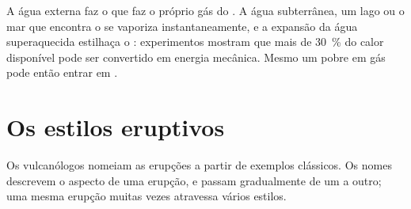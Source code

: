A água externa faz o que faz o próprio gás do . A água subterrânea, um lago ou o
mar que encontra o  se vaporiza instantaneamente, e a expansão da água
superaquecida estilhaça o : experimentos mostram que mais de \qty{30}{\percent} do
calor disponível pode ser convertido em energia mecânica. Mesmo um  pobre em gás
pode então entrar em .

\section{Os estilos eruptivos}

Os vulcanólogos nomeiam as erupções a partir de exemplos clássicos. Os nomes descrevem o aspecto
de uma erupção, e passam gradualmente de um a outro; uma mesma erupção muitas vezes atravessa
vários estilos.

